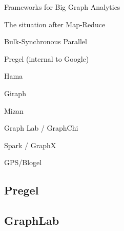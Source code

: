 \begin{frame}{Frameworks for Big Graph Analytics}	


The situation after Map-Reduce
\BI
\item Bulk-Synchronous Parallel 
\BI
  \item Pregel (internal to Google)
  \item Hama
  \item Giraph
  \item Mizan
\EI 
\item Graph Lab / GraphChi
\item Spark / GraphX
\item GPS/Blogel
\EI
	
\end{frame}

\subsection{Pregel}
\subsection{GraphLab}








%
%
%
% 
% 
%

